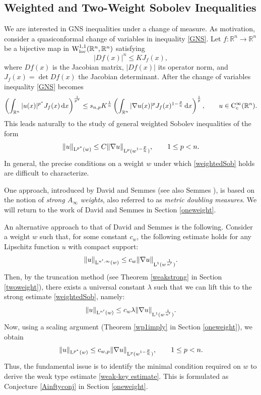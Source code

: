\documentclass[11pt, a4paper, reqno]{amsart}
\newcommand{\R}{\mathbb R}
\newcommand{\dx}{\,{\mathrm dx}}
\newcommand{\Lup}{\textup{L}}
\newcommand{\Ws}{\textup{W}}
\newcommand{\Con}{\textup{C}}
\theoremstyle{definition}
\theoremstyle{remark}
\begin{document}
\subsection{Weighted and Two-Weight Sobolev Inequalities}

We are interested in GNS inequalities under a change of measure. As motivation, consider a quasiconformal change of variables in inequality \eqref{GNS}. Let $f: \R^n \to \R^n$ be a bijective map in $\Ws_{\textup{loc}}^{1,1}(\R^n,\R^n)$ satisfying
\[
|Df(x)|^n \le K J_f(x),
\]
where $Df(x)$ is the Jacobian matrix, $|Df(x)|$ its operator norm, and $J_f(x) = \det Df(x)$ the Jacobian determinant.  
After the change of variables inequality \eqref{GNS} becomes
\[
\left( \int_{\R^n} |u(x)|^{p^*} J_f(x) \dx \right)^{\frac1{p^*}} 
\le s_{n,p} K^{\frac1n} \left( \int_{\R^n} |\nabla u(x)|^p J_f(x)^{1 - \frac{p}{n}} \dx \right)^{\frac1p}, \qquad u \in \Con_c^\infty(\R^n).
\]
This leads naturally to the study of general weighted Sobolev inequalities of the form
\begin{equation}\label{weightedSob}
\|u\|_{\Lup^{p^*}(w)} \le C \|\nabla u\|_{\Lup^p(w^{1-\frac{p}{n}})}, \qquad 1\leq p<n.
\end{equation}
In general, the precise conditions on a weight $w$ under which \eqref{weightedSob} holds are difficult to characterize.  

One approach, introduced by David and Semmes \cite{DS} (see also Semmes \cite{Sem}), is based on the notion of \emph{strong \(A_\infty\) weights}, also referred to as \emph{metric doubling measures}. We will return to the work of David and Semmes in Section \ref{oneweight}.

An alternative approach to that of David and Semmes is the following. Consider a weight $w$ such that, for some constant $c_w$, the following estimate holds for any Lipschitz function $u$ with compact support:
%
\begin{equation}\label{weak-key estimate}
\|u\|_{\Lup^{n',\infty}(w)} \le c_{w} \|\nabla u\|_{\Lup^1(w^\frac1{n'})}.
\end{equation}
Then, by the truncation method \cite{Maz} (see Theorem \ref{weakstrong} in Section \ref{twoweight}), there exists a universal constant $\lambda$ such that we can lift this to the strong estimate \eqref{weightedSob}, namely:
\[
\|u\|_{\Lup^{n'}(w)} \le c_{w}\lambda \|\nabla u\|_{\Lup^1(w^\frac1{n'})}.
\]
Now, using a scaling argument (Theorem \ref{wp1imply} in Section \ref{oneweight}), we obtain
\begin{equation}\label{Sob-cond-w}
\|u\|_{\Lup^{p^*}(w)} \le c_{w,p} \|\nabla u\|_{\Lup^p(w^{1-\frac{p}{n}})}, \qquad 1 \le p < n.
\end{equation}
Thus, the fundamental issue is to identify the minimal condition required on $w$ to derive the weak type estimate \eqref{weak-key estimate}. This is formulated as Conjecture \ref{Ainftyconj} in Section \ref{oneweight}. 
\end{document}
